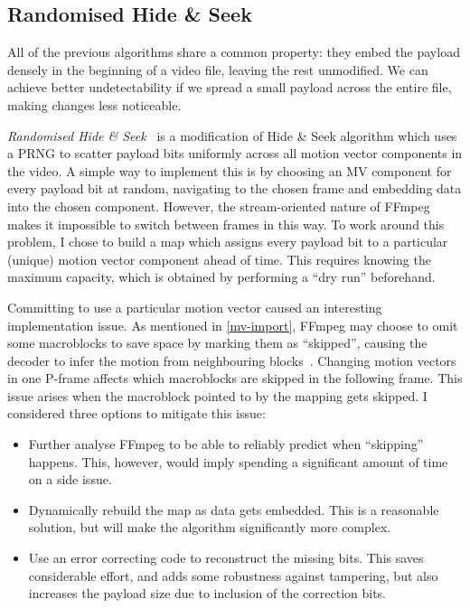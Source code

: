 \documentclass[12pt,british,twoside,notitlepage,usenames,dvipsnames,hypens,final]{report}
\numberwithin{equation}{section}
\numberwithin{figure}{section}
\begin{document}
\subsection{Randomised Hide \& Seek}
\label{rand-hidenseek}

All of the previous algorithms share a common property: they embed the payload densely in the beginning of a video file, leaving the rest unmodified. We can achieve better undetectability if we spread a small payload across the entire file, making changes less noticeable. 

\emph{Randomised Hide \& Seek}~\cite{bateman} is a modification of Hide \& Seek algorithm which uses a PRNG to scatter payload bits uniformly across all motion vector components in the video. A simple way to implement this is by choosing an MV component for every payload bit at random, navigating to the chosen frame and embedding data into the chosen component. However, the stream-oriented nature of FFmpeg makes it impossible to switch between frames in this way. To work around this problem, I chose to build a map which assigns every payload bit to a particular (unique) motion vector component ahead of time. This requires knowing the maximum capacity, which is obtained by performing a ``dry run'' beforehand. 

Committing to use a particular motion vector caused an interesting implementation issue. As mentioned in \ref{mv-import}, FFmpeg may choose to omit some macroblocks to save space by marking them as ``skipped'', causing the decoder to infer the motion from neighbouring blocks~\cite{tourapis2004direct}. Changing motion vectors in one P-frame affects which macroblocks are skipped in the following frame. This issue arises when the macroblock pointed to by the mapping gets skipped. I considered three options to mitigate this issue:
\begin{itemize}
\item Further analyse FFmpeg to be able to reliably predict when ``skipping'' happens. This, however, would imply spending a significant amount of time on a side issue.
\item Dynamically rebuild the map as data gets embedded. This is a reasonable solution, but will make the algorithm significantly more complex.
\item Use an error correcting code to reconstruct the missing bits. This saves considerable effort, and adds some robustness against tampering, but also increases the payload size due to inclusion of the correction bits.
\end{itemize}
\end{document}
